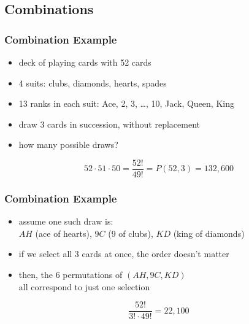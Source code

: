 \documentclass[dvipsnames]{beamer}
\begin{document}
\subsection{Combinations}


\begin{frame}
  \frametitle{Combination Example}

  \begin{example}
    \begin{itemize}
      \item deck of playing cards with 52 cards
      \item 4 suits: clubs, diamonds, hearts, spades
      \item 13 ranks in each suit: Ace, 2, 3, \ldots, 10, Jack, Queen, King
      \item draw 3 cards in succession, without replacement
      \item how many possible draws?
    \end{itemize}

    \pause
    \begin{equation*}
      52 \cdot 51 \cdot 50 = \frac{52!}{49!} = P(52,3) = 132,600
    \end{equation*}  
  \end{example}
\end{frame}

\begin{frame}
  \frametitle{Combination Example}

  \begin{example}
    \begin{itemize}
      \item assume one such draw is:\\
        $AH$ (ace of hearts), $9C$ (9 of clubs), $KD$ (king of diamonds)
      \item if we select all 3 cards at once, the order doesn't matter
      \item then, the 6 permutations of $(AH,9C,KD)$\\
        all correspond to just one selection
    \end{itemize}
    \begin{equation*}
      \frac{52!}{3! \cdot 49!} = 22,100
    \end{equation*}  
  \end{example}
\end{frame}
\end{document}

